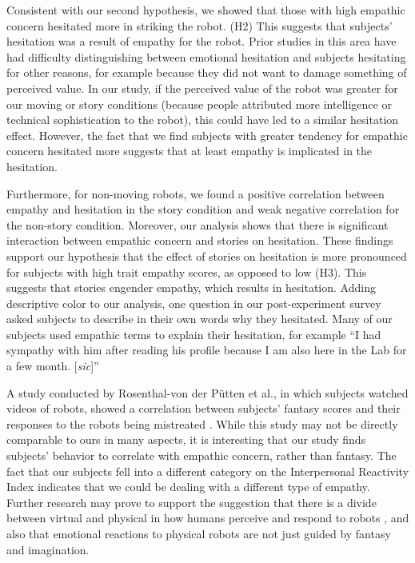 Consistent with our second hypothesis, we showed that those with high empathic concern hesitated more in striking the robot. (H2) This suggests that subjects' hesitation was a result of empathy for the robot. Prior studies in this area have had difficulty distinguishing between emotional hesitation and subjects hesitating for other reasons, for example because they did not want to damage something of perceived value. In our study, if the perceived value of the robot was greater for our moving or story conditions (because people attributed more intelligence or technical sophistication to the robot), this could have led to a similar hesitation effect. However, the fact that we find subjects with greater tendency for empathic concern hesitated more suggests that at least empathy is implicated in the hesitation.

Furthermore, for non-moving robots, we found a positive correlation between empathy and hesitation in the story condition and weak negative correlation for the non-story condition. Moreover, our analysis shows that there is significant interaction between empathic concern and stories on hesitation. These findings support our hypothesis that the effect of stories on hesitation is more pronounced for subjects with high trait empathy scores, as opposed to low (H3). This suggests that stories engender empathy, which results in hesitation. Adding descriptive color to our analysis, one question in our post-experiment survey asked subjects to describe in their own words why they hesitated. Many of our subjects used empathic terms to explain their hesitation, for example ``I had sympathy with him after reading his profile because I am also here in the Lab for a few month. [\emph{sic}]''

A study conducted by Rosenthal-von der P{\"u}tten et al., in which subjects watched videos of robots, showed a correlation between subjects' fantasy scores and their responses to the robots being mistreated \cite{rosenthal_emotional_reaction}. While this study may not be directly comparable to ours in many aspects, it is interesting that our study finds subjects' behavior to correlate with empathic concern, rather than fantasy. The fact that our subjects fell into a different category on the Interpersonal Reactivity Index indicates that we could be dealing with a different type of empathy. Further research may prove to support the suggestion that there is a divide between virtual and physical in how humans perceive and respond to robots \cite{bainbridge_robot_presence}, and also that emotional reactions to physical robots are not just guided by fantasy and imagination.




